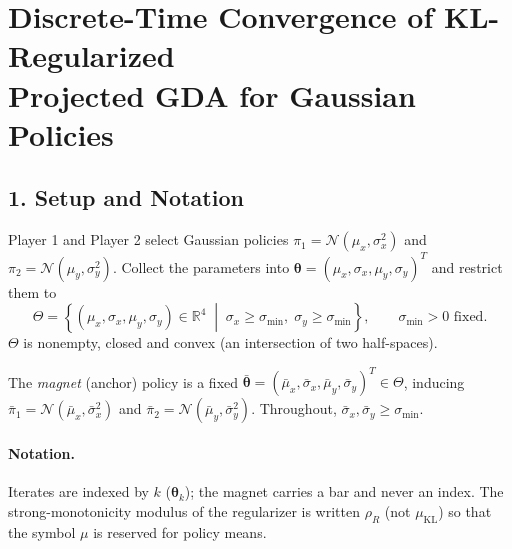 \documentclass{article}
\theoremstyle{definition}
\theoremstyle{remark}
\begin{document}
\section*{Discrete-Time Convergence of KL-Regularized\\ Projected GDA for Gaussian Policies}

\subsection*{1. Setup and Notation}

Player 1 and Player 2 select Gaussian policies $\pi_1 = \mathcal{N}(\mu_x, \sigma_x^2)$ and
$\pi_2 = \mathcal{N}(\mu_y, \sigma_y^2)$. Collect the parameters into
$\boldsymbol{\theta} = (\mu_x, \sigma_x, \mu_y, \sigma_y)^{T}$ and restrict them to
\begin{equation}
\Theta = \left\{ (\mu_x, \sigma_x, \mu_y, \sigma_y) \in \mathbb{R}^4 \;\middle|\;
\sigma_x \ge \sigma_{\min}, \; \sigma_y \ge \sigma_{\min} \right\},
\qquad \sigma_{\min} > 0 \text{ fixed.}
\end{equation}
$\Theta$ is nonempty, closed and convex (an intersection of two half-spaces).

The \emph{magnet} (anchor) policy is a fixed
$\bar{\boldsymbol{\theta}} = (\bar\mu_x, \bar\sigma_x, \bar\mu_y, \bar\sigma_y)^{T} \in \Theta$,
inducing $\bar\pi_1 = \mathcal{N}(\bar\mu_x, \bar\sigma_x^2)$ and
$\bar\pi_2 = \mathcal{N}(\bar\mu_y, \bar\sigma_y^2)$. Throughout, $\bar\sigma_x, \bar\sigma_y \ge \sigma_{\min}$.

\paragraph{Notation.} Iterates are indexed by $k$ ($\boldsymbol{\theta}_k$); the magnet carries a bar and
never an index. The strong-monotonicity modulus of the regularizer is written $\rho_R$ (not $\mu_{\mathrm{KL}}$)
so that the symbol $\mu$ is reserved for policy means.
\end{document}
